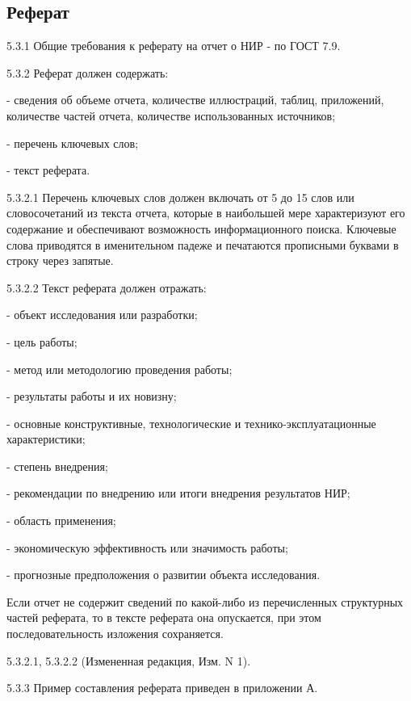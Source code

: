 \newpage

\subsection*{\Large{Реферат}}
5.3.1 Общие требования к реферату на отчет о НИР - по ГОСТ 7.9.

5.3.2 Реферат должен содержать:

- сведения об объеме отчета, количестве иллюстраций, таблиц, приложений, количестве частей отчета, количестве использованных источников;

- перечень ключевых слов;

- текст реферата.

5.3.2.1 Перечень ключевых слов должен включать от 5 до 15 слов или словосочетаний из текста отчета, которые в наибольшей мере характеризуют его содержание и обеспечивают возможность информационного поиска. Ключевые слова приводятся в именительном падеже и печатаются прописными буквами в строку через запятые.

5.3.2.2 Текст реферата должен отражать:

- объект исследования или разработки;

- цель работы;

- метод или методологию проведения работы;

- результаты работы и их новизну;

- основные конструктивные, технологические и технико-эксплуатационные характеристики;

- степень внедрения;

- рекомендации по внедрению или итоги внедрения результатов НИР;

- область применения;

- экономическую эффективность или значимость работы;

- прогнозные предположения о развитии объекта исследования.

Если отчет не содержит сведений по какой-либо из перечисленных структурных частей реферата, то в тексте реферата она опускается, при этом последовательность изложения сохраняется.

5.3.2.1, 5.3.2.2 (Измененная редакция, Изм. N 1).

5.3.3 Пример составления реферата приведен в приложении А.
